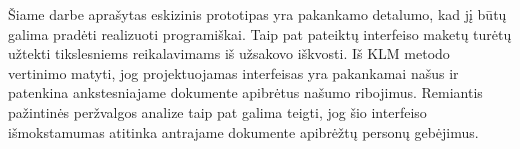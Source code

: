 Šiame darbe aprašytas eskizinis prototipas yra pakankamo detalumo, kad jį būtų galima
pradėti realizuoti programiškai. Taip pat pateiktų interfeiso maketų turėtų užtekti
tikslesniems reikalavimams iš užsakovo iškvosti.
Iš KLM metodo vertinimo matyti, jog projektuojamas interfeisas yra pakankamai našus
ir patenkina ankstesniajame dokumente apibrėtus našumo ribojimus.
Remiantis pažintinės peržvalgos analize taip pat galima teigti, jog šio interfeiso
išmokstamumas atitinka antrajame dokumente apibrėžtų personų gebėjimus.

